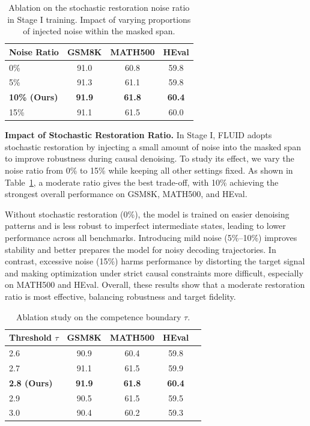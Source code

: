 \documentclass[11pt]{article}
\begin{document}
\begin{table}[h]
\centering
\small
\setlength{\tabcolsep}{9pt}
\begin{tabular}{lccc}
\toprule
\textbf{Noise Ratio} & \textbf{GSM8K} & \textbf{MATH500} & \textbf{HEval} \\
\midrule
0\%  & 91.0 & 60.8 & 59.8 \\
5\%  & 91.3 & 61.1 & 59.8 \\
\rowcolor{rowpurple}
\textbf{10\% (Ours)} & \textbf{91.9} & \textbf{61.8} & \textbf{60.4} \\
15\% & 91.1 & 61.5 & 60.0 \\
\bottomrule
\end{tabular}
\caption{Ablation on the stochastic restoration noise ratio in Stage I training. Impact of varying proportions of injected noise within the masked span.}
\label{tab:noise_ratio_ablation}
\end{table}
\textbf{Impact of Stochastic Restoration Ratio.}
In Stage I, FLUID adopts stochastic restoration by injecting a small amount of noise into the masked span to improve robustness during causal denoising. To study its effect, we vary the noise ratio from 0\% to 15\% while keeping all other settings fixed. As shown in Table~\ref{tab:noise_ratio_ablation}, a moderate ratio gives the best trade-off, with 10\% achieving the strongest overall performance on GSM8K, MATH500, and HEval.

Without stochastic restoration (0\%), the model is trained on easier denoising patterns and is less robust to imperfect intermediate states, leading to lower performance across all benchmarks. Introducing mild noise (5\%--10\%) improves stability and better prepares the model for noisy decoding trajectories. In contrast, excessive noise (15\%) harms performance by distorting the target signal and making optimization under strict causal constraints more difficult, especially on MATH500 and HEval. Overall, these results show that a moderate restoration ratio is most effective, balancing robustness and target fidelity.

\begin{table}[h]
\centering
\setlength{\tabcolsep}{9pt}
\small
\begin{tabular}{lcccc}
\toprule
\textbf{Threshold $\tau$}  & \textbf{GSM8K} & \textbf{MATH500} & \textbf{HEval}\\
\midrule
2.6  & 90.9 & 60.4 & 59.8 \\
2.7 & 91.1 & 61.5 & 59.9 \\
\rowcolor{rowpurple} %
\textbf{2.8 (Ours)}  & \textbf{91.9} & \textbf{61.8} & \textbf{60.4} \\
 2.9 & 90.5 & 61.5 & 59.5 \\
 3.0 & 90.4 & 60.2 & 59.3 \\
\bottomrule
\end{tabular}
\caption{Ablation study on the competence boundary $\tau$.}
\label{tab:tau_sensitivity}
\end{table}
\end{document}
